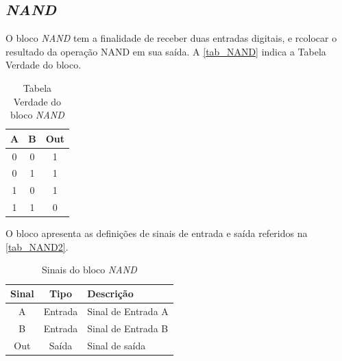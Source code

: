 \renewcommand{\NomeBloco}{\emph{NAND}}
\renewcommand{\NomeBlocoNoIt}{NAND}
\renewcommand{\NomePTab}{tab_\NomeBlocoNoIt}
\renewcommand{\NomeSTab}{tab_\NomeBlocoNoIt2}
\renewcommand{\NomePFig}{fig_\NomeBlocoNoIt}
\renewcommand{\NomeSFig}{fig_\NomeBlocoNoIt2}
\renewcommand{\NomeTTab}{tab_\NomeBlocoNoIt3}

\subsection{\NomeBloco}
\label{inversor1}

O bloco \NomeBloco{} tem a finalidade de receber duas entradas digitais, e rcolocar o resultado da opera{\c c}\~ao NAND em sua sa\'ida. A \autoref{\NomePTab} indica a Tabela Verdade do bloco.

\begin{table}[htbp]

\caption{Tabela Verdade do bloco \NomeBloco}%
\label{\NomePTab}
\centering
\begin{tabular}{ccc}
\toprule
    A & B & Out \\
    \midrule \midrule
    0 & 0 & 1 \\
    \midrule
    0 & 1 & 1\\
    \midrule
    1 & 0 & 1\\
    \midrule
    1 & 1 & 0\\
\bottomrule

\end{tabular}
\end{table}

O bloco apresenta as defini{\c c}\~oes de sinais de entrada e sa\'ida referidos na \autoref{\NomeSTab}.

\begin{table}[htbp]
\caption{Sinais do bloco \NomeBloco}
\label{\NomeSTab}
\centering
\begin{tabular}{ccl}

    \toprule
    Sinal & Tipo    & Descri{\c c}\~ao        \\
    \midrule \midrule
    A    & Entrada & Sinal de Entrada A \\
    \midrule
    B    & Entrada & Sinal de Entrada B \\
    \midrule
    Out    & Sa\'ida & Sinal de sa\'ida \\
    \bottomrule
\end{tabular}
\end{table}

